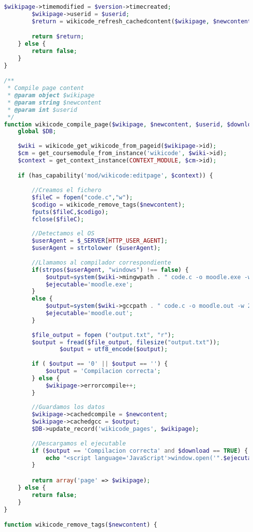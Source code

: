 \begin{lstlisting}[language=PHP]
        $wikipage->timemodified = $version->timecreated;
        $wikipage->userid = $userid;
        $return = wikicode_refresh_cachedcontent($wikipage, $newcontent);

        return $return;
    } else {
        return false;
    }
}

/**
 * Compile page content
 * @param object $wikipage
 * @param string $newcontent
 * @param int $userid
 */
function wikicode_compile_page($wikipage, $newcontent, $userid, $download) {
    global $DB;
    
    $wiki = wikicode_get_wikicode_from_pageid($wikipage->id);
    $cm = get_coursemodule_from_instance('wikicode', $wiki->id);
    $context = get_context_instance(CONTEXT_MODULE, $cm->id);

    if (has_capability('mod/wikicode:editpage', $context)) {
    	
		//Creamos el fichero
		$fileC = fopen("code.c","w"); 
		$codigo = wikicode_remove_tags($newcontent);
		fputs($fileC,$codigo); 
		fclose($fileC);
		
		//Detectamos el OS
		$userAgent = $_SERVER[HTTP_USER_AGENT];
		$userAgent = strtolower ($userAgent);
		
		//Llamamos al compilador correspondiente
		if(strpos($userAgent, "windows") !== false) {
        	$output=system($wiki->mingwpath . " code.c -o moodle.exe -w 2> output.txt");
			$ejecutable='moodle.exe';
		}
		else {
			$output=system($wiki->gccpath . " code.c -o moodle.out -w 2> output.txt");
			$ejecutable='moodle.out';
		}
		
		$file_output = fopen ("output.txt", "r");
   		$output = fread($file_output, filesize("output.txt"));
            	$output = utf8_encode($output);
		
		if ( $output == '0' || $output == '') {
			$output = 'Compilacion correcta';
		} else {
			$wikipage->errorcompile++;
		}
		
        //Guardamos los datos
        $wikipage->cachedcompile = $newcontent;
		$wikipage->cachedgcc = $output;
		$DB->update_record('wikicode_pages', $wikipage);
		
		//Descargamos el ejecutable
		if ($output == 'Compilacion correcta' and $download == TRUE) {
			echo "<script language='JavaScript'>window.open('".$ejecutable."')</script>";
		}

        return array('page' => $wikipage);
    } else {
        return false;
    }
}

function wikicode_remove_tags($newcontent) {
	

\end{lstlisting}
